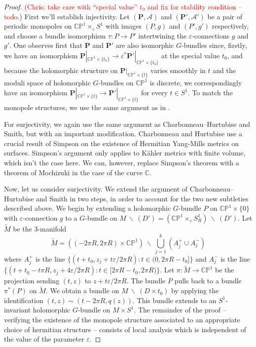 \documentclass[11pt, oneside, reqno]{amsart}
\theoremstyle{definition} \newtheorem{definition}{Definition}[section]
\theoremstyle{definition} \newtheorem{remark}[definition]{Remark}
\theoremstyle{definition} \newtheorem{remarks}[definition]{Remarks}
\theoremstyle{definition} \newtheorem{question}[definition]{Question}
\theoremstyle{definition} \newtheorem*{note}{Note}
\theoremstyle{definition} \newtheorem{example}[definition]{Example}
\theoremstyle{definition} \newtheorem{examples}[definition]{Examples}
\newcommand{\bb}[1]{\mathbb{#1}}
\newcommand{\mc}[1]{\mathcal{#1}}
\newcommand{\wt}[1]{\widetilde{#1}}
\newcommand{\bo}[1]{\boldsymbol{#1}}
\newcommand{\bs}{\ \backslash \ }
\newcommand{\CC}{\mathbb{C}}
\newcommand{\eps}{\varepsilon}
\newcommand{\chris}[1]{(\textcolor{red}{Chris: #1})}
\begin{document}
\begin{proof}
\chris{take care with ``special value'' $t_0$ and fix for stability condition -- todo.}
First we'll establish injectivity.  Let $(\bo P, \mc A)$ and $(\bo P', \mc A')$ be a pair of periodic monopoles on $\bb{CP}^1 \times_\eps S^1$ with images $(P,g)$ and $(P', g')$ respectively, and choose a bundle isomorphism $\tau \colon P \to P'$ intertwining the $\eps$-connections $g$ and $g'$.  One observes first that $\bo P$ and $\bo P'$ are also isomorphic $G$-bundles since, firstly, we have an isomorphism $\bo P|_{\bb{CP}^1 \times \{t_0\}} \to \eps^*\bo P'|_{\bb{CP}^1 \times \{t_0\}}$ at the special value $t_0$, and because the holomorphic structure on $\bo P|_{\bb{CP}^1 \times \{t\}}$ varies smoothly in $t$ and the moduli space of holomorphic $G$-bundles on $\bb{CP}^1$ is discrete, we correspondingly have an isomorphism $\bo P|_{\bb{CP}^1 \times \{t\}} \to \bo P'|_{\bb{CP}^1 \times \{t\}}$ for every $t \in S^1$.  To match the monopole structures, we use the same argument as in \cite[Proposition 5.6]{Smith}.

For surjectivity, we again use the same argument as Charbonneau--Hurtubise and Smith, but with an important modification.  Charbonneau and Hurtubise use a crucial result of Simpson \cite[Theorem 1]{Simpson} on the existence of Hermitian Yang-Mills metrics on surfaces.  Simpson's argument only applies to K\"ahler metrics with finite volume, which isn't the case here.  We can, however, replace Simpson's theorem with a theorem of Mochizuki \cite[Corollary 3.13]{MochizukiKH} in the case of the curve $\CC$.

Now, let us consider surjectivity.  We extend the argument of Charbonneau--Hurtubise and Smith in two steps, in order to account for the two new subtleties described above.  We begin by extending a holomorphic $G$-bundle $P$ on $\bb{CP}^1 \times \{0\}$ with $\eps$-connection $g$ to a $G$-bundle on $M \bs (D') = (\bb{CP}^1 \times_\eps S^1_R) \bs (D')$.  Let $\wt M$ be the 3-manifold
\[\wt M = ((-2\pi R, 2\pi R) \times \bb{CP}^1) \bs \bigcup_{j=1}^k (A^+_j \cup A^-_j)\]
where $A^+_j$ is the line $\{(t+ t_0,z_j + t \eps/{2\pi R}) \colon t \in (0, 2\pi R - t_0]\}$ and $A^-_j$ is the line $\{(t + t_0 - t \pi R,z_j + 4 \eps/{2\pi R}) \colon t \in [2\pi R-t_0, 2 \pi R)\}$.
Let $\pi \colon \wt M \to \bb{CP}^1$ be the projection sending $(t,z)$ to $z + t\eps/2 \pi R$. The bundle $P$ pulls back to a bundle $\pi^*(P)$ on $\wt M$. We obtain a bundle on $M \bs (D \times t_0)$ by applying the identification $(t,z) \sim (t - 2 \pi R, q(z))$. This bundle extends to an $S^1$-invariant holomorphic $G$-bundle on $M \times S^1$. The remainder of the proof -- verifying the existence of the monopole structure associated to an appropriate choice of hermitian structure -- consists of local analysis which is independent of the value of the parameter $\eps$. 


\end{proof}
\end{document}
